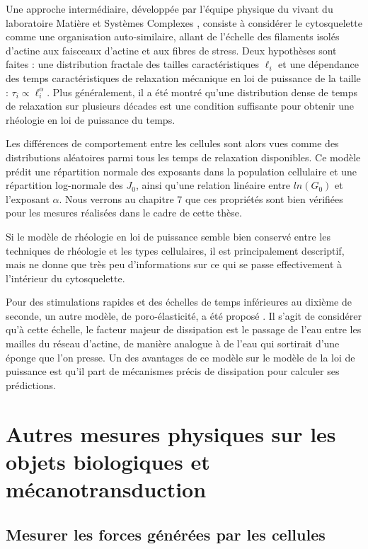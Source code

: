 Une approche intermédiaire, développée par l'équipe physique du vivant du laboratoire Matière et Systèmes Complexes \parencite{balland_power_2006}, consiste à considérer le cytosquelette comme une organisation auto-similaire, allant de l'échelle des filaments isolés d'actine aux faisceaux d'actine et aux fibres de stress. Deux hypothèses sont faites : une distribution fractale des tailles caractéristiques $\ell_i$ et une dépendance des temps caractéristiques de relaxation mécanique en loi de puissance de la taille : $\tau_i \propto  \ell_i^{\alpha}$. Plus généralement, il a été montré qu'une distribution dense de temps de relaxation sur plusieurs décades est une condition suffisante pour obtenir une rhéologie en loi de puissance du temps. 
 

 Les différences de comportement entre les cellules sont alors vues comme des distributions aléatoires parmi tous les temps de relaxation disponibles. Ce modèle prédit une répartition normale des exposants dans la population cellulaire et une répartition log-normale des $J_0$, ainsi qu'une relation linéaire entre $ln(G_0)$ et l'exposant $\alpha$. Nous verrons au chapitre 7 que ces propriétés sont bien vérifiées pour les mesures réalisées dans le cadre de cette thèse. 

Si le modèle de rhéologie en loi de puissance semble bien conservé entre les techniques de rhéologie et les types cellulaires, il est principalement descriptif, mais ne donne que très peu d'informations sur ce qui se passe effectivement à l'intérieur du cytosquelette. 

Pour des stimulations rapides et des échelles de temps inférieures au dixième de seconde, un autre modèle, de poro-élasticité, a été proposé \parencite{moeendarbary_cytoplasm_2013}. 
Il s'agit de considérer qu'à cette échelle, le facteur majeur de dissipation est le passage de l'eau entre les mailles du réseau d'actine, de manière analogue à de l'eau qui sortirait d'une éponge que l'on presse.  
Un des avantages de ce modèle sur le modèle de la loi de puissance est qu'il part de mécanismes précis de dissipation pour calculer ses prédictions. 

\section{Autres mesures physiques sur les objets biologiques et mécanotransduction}

 



\subsection{Mesurer les forces générées par les cellules}

